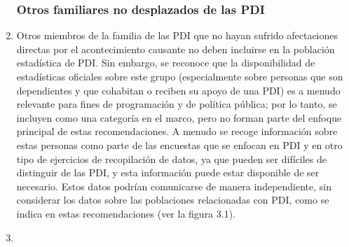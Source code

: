 \documentclass[
]{book}
\begin{document}
\begin{enumerate}
{  \subsubsection{Otros familiares no desplazados de las PDI}\label{otros-familiares-no-desplazados-de-las-pdi}}
\item
  Otros miembros de la familia de las PDI que no hayan sufrido afectaciones directas por el acontecimiento causante no deben incluirse en la población estadística de PDI. Sin embargo, se reconoce que la disponibilidad de estadísticas oficiales sobre este grupo (especialmente sobre personas que son dependientes y que cohabitan o reciben su apoyo de una PDI) es a menudo relevante para fines de programación y de política pública; por lo tanto, se incluyen como una categoría en el marco, pero no forman parte del enfoque principal de estas recomendaciones. A menudo se recoge información sobre estas personas como parte de las encuestas que se enfocan en PDI y en otro tipo de ejercicios de recopilación de datos, ya que pueden ser difíciles de distinguir de las PDI, y esta información puede estar disponible de ser necesario. Estos datos podrían comunicarse de manera independiente, sin considerar los datos sobre las poblaciones relacionadas con PDI, como se indica en estas recomendaciones (ver la figura 3.1).
\item ~
  \hypertarget{personas-que-han-superado-las-principales-vulnerabilidades-relacionadas-con-el-desplazamiento}{%
}
\end{enumerate}
\end{document}
